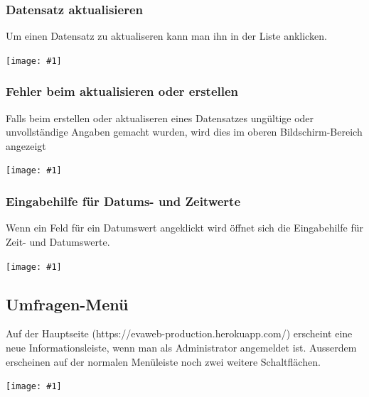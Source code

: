\documentclass{article}
\newcommand{\inlineimage}[1]{
    \texttt{[image: \#1]}
}
\begin{document}
\subsubsection{Datensatz aktualisieren}
Um einen Datensatz zu aktualiseren kann man ihn in der Liste anklicken.
\newline
\inlineimage{images/adminDashboardListe.png}

\subsubsection{Fehler beim aktualisieren oder erstellen}
Falls beim erstellen oder aktualiseren eines Datensatzes ungültige oder unvollständige Angaben gemacht wurden, wird dies im oberen Bildschirm-Bereich angezeigt
\newline
\inlineimage{images/adminDashboardNeuFehler.png}

\pagebreak
\subsubsection{Eingabehilfe für Datums- und Zeitwerte}
Wenn ein Feld für ein Datumswert angeklickt wird öffnet sich die Eingabehilfe für Zeit- und Datumswerte.
\newline
\inlineimage{images/adminDashboardZeitPicker.png}

\subsection{Umfragen-Menü}
Auf der Hauptseite (https://evaweb-production.herokuapp.com/) erscheint eine neue Informationsleiste, wenn man als Administrator angemeldet ist.
\newline
Ausserdem erscheinen auf der normalen Menüleiste noch zwei weitere Schaltflächen.
\newline
\inlineimage{images/adminFrontendBar.png}

\renewcommand{\bibsection}{\section{Quellen}}

% 
\end{document}
